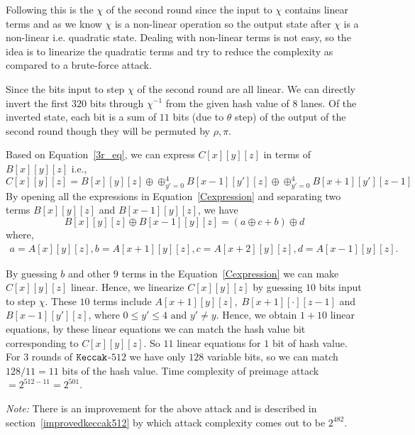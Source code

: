   Following this is the $\chi$ of the second round since the input to $\chi$ contains linear terms and as we know $\chi$ is a non-linear operation so the output state after $\chi$ is a non-linear i.e. quadratic state. Dealing with non-linear terms is not easy, so the idea is to linearize the quadratic terms and try to reduce the complexity as compared to a brute-force attack.

  Since the bits input to step $\chi$ of the second round are all linear.
   We can directly invert the first $320$ bits through $\chi^{-1}$ from
    the given hash value of $8$ lanes. Of the inverted state, each bit
     is a sum of $11$ bits (due to $\theta$ step) of the output of the
      second round though they will be permuted by $\rho, \pi$.

  Based on Equation~\ref{3r_eq}, we can express $C[x][y][z]$ in terms of $B[x][y][z]$ i.e.,  
\begin{equation}\label{Cexpression}
 C[x][y][z] = B[x][y][z] \oplus \oplus_{y' = 0}^{4} B[x-1][y'][z] \oplus \oplus_{y' = 0}^{4} B[x+1][y'][z-1]
\end{equation}
  By opening all the expressions in Equation~\ref{Cexpression} and separating two terms $B[x][y][z]$ and $B[x-1][y][z]$, we have
\begin{equation}
 B[x][y][z] \oplus B[x-1][y][z] = (a \oplus c + b) \oplus d
\end{equation}
 where,
\begin{eqnarray}
   a = A[x][y][z], b = A[x + 1][y][z], c = A[x + 2][y][z], d = A[x - 1][y][z].
\end{eqnarray}
 
    By guessing $b$ and other $9$ terms in the
     Equation~\ref{Cexpression} we can make $C[x][y][z]$ linear. 
    Hence, we linearize $C[x][y][z]$ by guessing $10$ bits input to step $\chi$.
     These $10$ terms include $A[x + 1][y][z],\;B[x + 1][\cdot][z-1]$ and $B[x-1][y'][z]$, where $0 \leq y' \leq 4 \text{ and } y' \neq y$. 
     Hence, we obtain $1 + 10$ linear equations, by these linear equations we can match the hash value bit corresponding to $C[x][y][z]$. So $11$ linear equations for $1$ bit of hash value. For $3$ rounds of $\mbox{\texttt{Keccak}}$-$512$ we have only $128$ variable bits, so we can match $128/11 = 11$ bits of the hash value.
    Time complexity of preimage attack $= 2^{512 - 11} = 2^{501}$.

   \noindent\textit{Note:} There is an improvement for the above attack and is described in section~\ref{improvedkeccak512} by which attack complexity comes out to be $2^{482}$.

